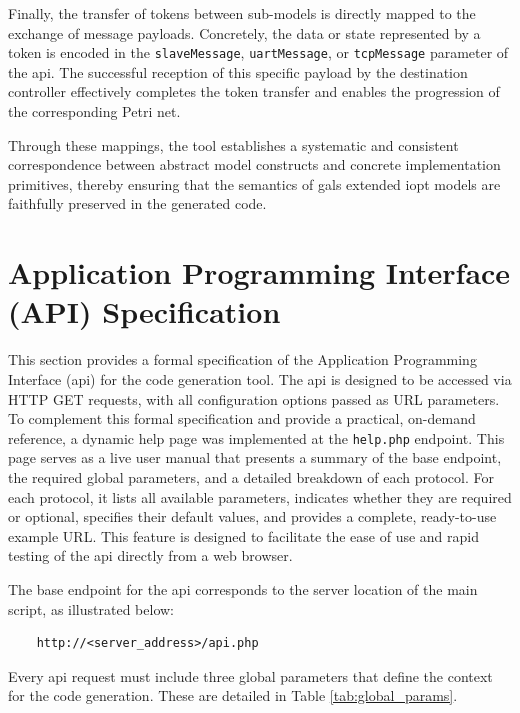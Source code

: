 Finally, the transfer of tokens between sub-models is directly mapped to the exchange of message payloads. Concretely, the data or state represented by a token is encoded in the \texttt{slaveMessage}, \texttt{uartMessage}, or \texttt{tcpMessage} parameter of the \gls{api}. The successful reception of this specific payload by the destination controller effectively completes the token transfer and enables the progression of the corresponding Petri net.

Through these mappings, the tool establishes a systematic and consistent correspondence between abstract model constructs and concrete implementation primitives, thereby ensuring that the semantics of \gls{gals} extended \gls{iopt} models are faithfully preserved in the generated code.



\section{Application Programming Interface (API) Specification}
\label{sec:api_spec}

This section provides a formal specification of the Application Programming Interface (\gls{api}) for the code generation tool. The \gls{api} is designed to be accessed via HTTP GET requests, with all configuration options passed as URL parameters.
To complement this formal specification and provide a practical, on-demand reference, a dynamic help page was implemented at the \texttt{help.php} endpoint. This page serves as a live user manual that presents a summary of the base endpoint, the required global parameters, and a detailed breakdown of each protocol. For each protocol, it lists all available parameters, indicates whether they are required or optional, specifies their default values, and provides a complete, ready-to-use example URL. This feature is designed to facilitate the ease of use and rapid testing of the \gls{api} directly from a web browser.

The base endpoint for the \gls{api} corresponds to the server location of the main script, as illustrated below:
\begin{verbatim}
    http://<server_address>/api.php
\end{verbatim}

Every \gls{api} request must include three global parameters that define the context for the code generation. These are detailed in Table \ref{tab:global_params}.

